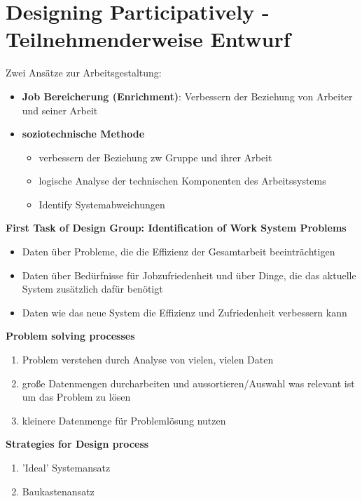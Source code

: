 \section{Designing Participatively - Teilnehmenderweise Entwurf}
Zwei Ansätze zur Arbeitsgestaltung:
\begin{itemize}
	\item \textbf{Job Bereicherung (Enrichment)}: Verbessern der Beziehung von Arbeiter und seiner Arbeit
	\item \textbf{soziotechnische Methode}
	\begin{itemize}
		\item verbessern der Beziehung zw Gruppe und ihrer Arbeit
		\item logische Analyse der technischen Komponenten des Arbeitssystems
		\item Identify Systemabweichungen
	\end{itemize}
\end{itemize}

\textbf{First Task of Design Group: Identification of Work System Problems}
\begin{itemize}
	\item Daten über Probleme, die die Effizienz der Gesamtarbeit beeinträchtigen
	\item Daten über Bedürfnisse für Jobzufriedenheit und über Dinge, die das aktuelle System zusätzlich dafür benötigt
	\item Daten wie das neue System die Effizienz und Zufriedenheit verbessern kann
\end{itemize}

\textbf{Problem solving processes}
\begin{enumerate}
	\item Problem verstehen durch Analyse von vielen, vielen Daten
	\item große Datenmengen durcharbeiten und aussortieren/Auswahl was relevant ist um das Problem zu lösen
	\item kleinere Datenmenge für Problemlösung nutzen
\end{enumerate}

\textbf{Strategies for Design process}
\begin{enumerate}
	\item 'Ideal' Systemansatz
	\item Baukastenansatz
\end{enumerate}

